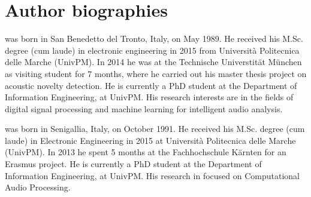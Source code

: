 \documentclass[review]{elsarticle}
\begin{document}




\newpage
\section*{Author biographies}


 was born in San Benedetto del Tronto, Italy, on May 1989. He received his M.Sc. degree (cum laude) in electronic engineering in 2015 from Universit\`{a} Politecnica delle Marche (UnivPM). In 2014 he was at the Technische Universtit\"at M\"unchen as visiting student for 7 months, where he carried out his master thesis project on acoustic novelty detection. He is currently a PhD student at the Department of Information Engineering, at UnivPM. His research interests are in the fields of digital signal processing and machine learning for intelligent audio analysis.
\vspace{1cm}

 was born in Senigallia, Italy, on October 1991. He received his M.Sc. degree (cum laude) in Electronic Engineering in 2015 at Universit\`{a} Politecnica delle Marche (UnivPM). In 2013 he spent 5 months at the Fachhochschule K\"arnten for an Erasmus project. He is currently a PhD student at the Department of Information Engineering, at UnivPM. His research in focused on Computational Audio Processing.
\vspace{1cm}
\end{document}
